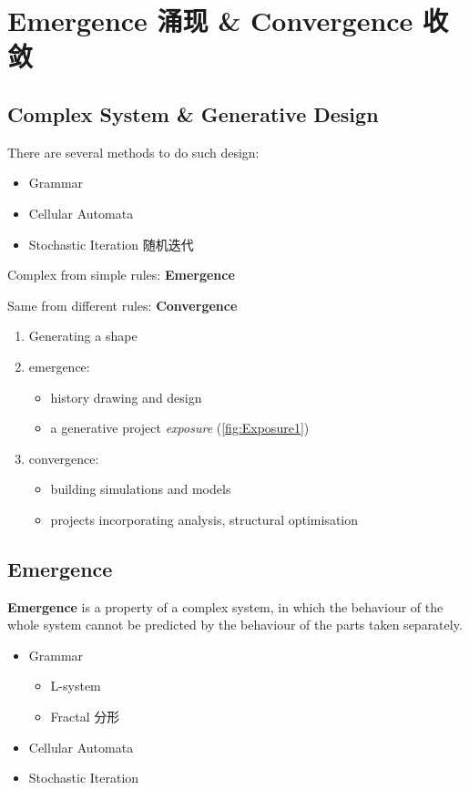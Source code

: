 \documentclass[a4paper, openany]{book}
\begin{document}
\chapter{Emergence 涌现 \& Convergence 收敛}

\section{Complex System \& Generative Design}

There are several methods to do such design:
\begin{itemize}
  \item Grammar
  \item Cellular Automata
  \item Stochastic Iteration 随机迭代
\end{itemize}

Complex from simple rules: \textbf{Emergence}

Same from different rules: \textbf{Convergence}

\begin{enumerate}
  \item Generating a shape
  \item emergence:
  \begin{itemize}
    \item history drawing and design
    \item a generative project \textit{exposure} (\cref{fig:Exposure1})
  \end{itemize}
  \item convergence:
  \begin{itemize}
    \item building simulations and models
    \item projects incorporating analysis, structural optimisation
  \end{itemize}
\end{enumerate}

\section{Emergence}

\textbf{Emergence} is a property of a complex system, in which the behaviour of the whole system cannot be predicted by the behaviour of the parts taken separately.

\begin{itemize}
  \item Grammar
  \begin{itemize}
    \item L-system
    \item Fractal 分形
  \end{itemize}
  \item Cellular Automata
  \item Stochastic Iteration
\end{itemize}
\end{document}
